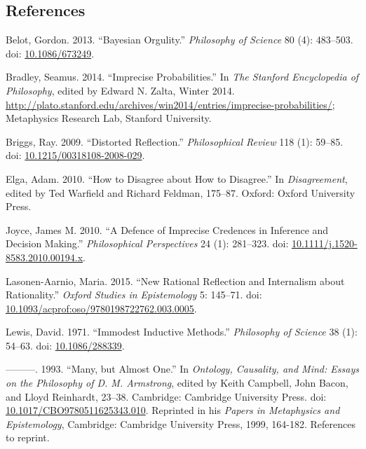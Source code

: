 \documentclass[
  11pt,
  letterpaper,
  DIV=11,
  numbers=noendperiod,
  twoside]{scrartcl}
\newlength{\cslhangindent}
\newenvironment{CSLReferences}[2] %
 {\begin{list}{}{%
  \setlength{\itemindent}{0pt}
  \setlength{\leftmargin}{0pt}
  \setlength{\parsep}{0pt}
  \ifodd #1
   \setlength{\leftmargin}{\cslhangindent}
   \setlength{\itemindent}{-1\cslhangindent}
  \fi
  \setlength{\itemsep}{#2\baselineskip}}}
 {\end{list}}
\begin{document}
\subsection*{References}\label{references}

\label{refs}
\begin{CSLReferences}{1}{0}
Belot, Gordon. 2013. {``Bayesian Orgulity.''} \emph{Philosophy of
Science} 80 (4): 483--503. doi:
\href{https://doi.org/10.1086/673249}{10.1086/673249}.

Bradley, Seamus. 2014. {``Imprecise Probabilities.''} In \emph{The
Stanford Encyclopedia of Philosophy}, edited by Edward N. Zalta, Winter
2014.
\url{http://plato.stanford.edu/archives/win2014/entries/imprecise-probabilities/};
Metaphysics Research Lab, Stanford University.

Briggs, Ray. 2009. {``Distorted Reflection.''} \emph{Philosophical
Review} 118 (1): 59--85. doi:
\href{https://doi.org/10.1215/00318108-2008-029}{10.1215/00318108-2008-029}.

Elga, Adam. 2010. {``How to Disagree about How to Disagree.''} In
\emph{Disagreement}, edited by Ted Warfield and Richard Feldman,
175--87. Oxford: Oxford University Press.

Joyce, James M. 2010. {``A Defence of Imprecise Credences in Inference
and Decision Making.''} \emph{Philosophical Perspectives} 24 (1):
281--323. doi:
\href{https://doi.org/10.1111/j.1520-8583.2010.00194.x}{10.1111/j.1520-8583.2010.00194.x}.

Lasonen-Aarnio, Maria. 2015. {``New Rational Reflection and Internalism
about Rationality.''} \emph{Oxford Studies in Epistemology} 5: 145--71.
doi:
\href{https://doi.org/10.1093/acprof:oso/9780198722762.003.0005}{10.1093/acprof:oso/9780198722762.003.0005}.

Lewis, David. 1971. {``Immodest Inductive Methods.''} \emph{Philosophy
of Science} 38 (1): 54--63. doi:
\href{https://doi.org/10.1086/288339}{10.1086/288339}.

---------. 1993. {``Many, but Almost One.''} In \emph{Ontology,
Causality, and Mind: Essays on the Philosophy of {D. M. Armstrong}},
edited by Keith Campbell, John Bacon, and Lloyd Reinhardt, 23--38.
Cambridge: Cambridge University Press. doi:
\href{https://doi.org/10.1017/CBO9780511625343.010}{10.1017/CBO9780511625343.010}.
Reprinted in his \emph{Papers in Metaphysics and Epistemology},
Cambridge: Cambridge University Press, 1999, 164-182. References to
reprint.


\end{CSLReferences}
\end{document}
